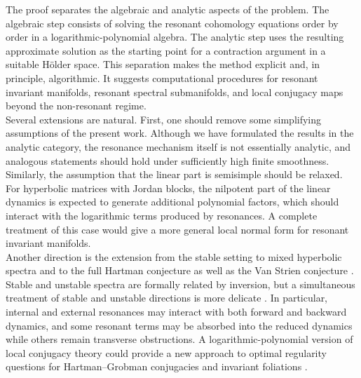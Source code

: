 \documentclass{amsart}
\theoremstyle{plain}
\theoremstyle{definition}
\begin{document}
The proof separates the algebraic and analytic aspects of the problem.  The algebraic step consists of solving the resonant cohomology equations order by order in a logarithmic-polynomial algebra.  The analytic step uses the resulting approximate solution as the starting point for a contraction argument in a suitable H\"{o}lder space.  This separation makes the method explicit and, in principle, algorithmic.  It suggests computational procedures for resonant invariant manifolds, resonant spectral submanifolds, and local conjugacy maps beyond the non-resonant regime.\\

Several extensions are natural.  First, one should remove some simplifying assumptions of the present work.  Although we have formulated the results in the analytic category, the resonance mechanism itself is not essentially analytic, and analogous statements should hold under sufficiently high finite smoothness.  Similarly, the assumption that the linear part is semisimple should be relaxed.  For hyperbolic matrices with Jordan blocks, the nilpotent part of the linear dynamics is expected to generate additional polynomial factors, which should interact with the logarithmic terms produced by resonances.  A complete treatment of this case would give a more general local normal form for resonant invariant manifolds.\\

Another direction is the extension from the stable setting to mixed hyperbolic spectra and to the full Hartman conjecture as well as the Van Strien conjecture \cite{vanstrien1990smooth}.  Stable and unstable spectra are formally related by inversion, but a simultaneous treatment of stable and unstable directions is more delicate \cite{hartman1960lemma,hartman1960local,newhouse2017hartman,pugh1969theorem}.  In particular, internal and external resonances may interact with both forward and backward dynamics, and some resonant terms may be absorbed into the reduced dynamics while others remain transverse obstructions.  A logarithmic-polynomial version of local conjugacy theory could provide a new approach to optimal regularity questions for Hartman--Grobman conjugacies and invariant foliations \cite{bates2000invariant,hasselblatt1994periodic,pugh1997holder,luZhangZhang2017differentiability}.\\
\end{document}

